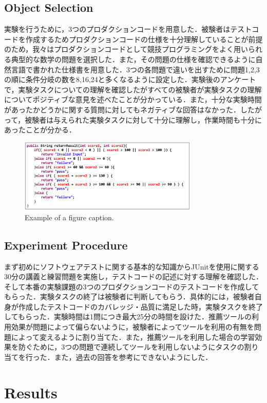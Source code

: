 \documentclass[conference]{IEEEtran}
\begin{document}
\subsection{Object Selection}
実験を行うために，3つのプロダクションコードを用意した．被験者はテストコードを作成するためプロダクションコードの仕様を十分理解していることが前提のため，我々はプロダクションコードとして競技プログラミングをよく用いられる典型的な数学の問題を選択した．また，その問題の仕様を確認できるように自然言語で書かれた仕様書を用意した．3つの各問題で違いを出すために問題1,2,3の順に条件分岐の数を8,16,24と多くなるように設定した．実験後のアンケートで，実験タスクについての理解を確認したがすべての被験者が実験タスクの理解についてポジティブな意見を述べたことが分かっている．また，十分な実験時間があったかどうかに関する質問に対してもネガティブな回答はなかった．したがって，被験者は与えられた実験タスクに対して十分に理解し，作業時間も十分にあったことが分かる．

\begin{figure}[htbp]
\centerline{\includegraphics[width=8.5cm]{src.pdf}}
\caption{Example of a figure caption.}
\label{fig}
\end{figure}

\subsection{Experiment Procedure}
まず初めにソフトウェアテストに関する基本的な知識からJUnitを使用に関する30分の講義と練習問題を実施し，テストコードの記述に対する理解を確認した．そして本番の実験課題の3つのプロダクションコードのテストコードを作成してもらった．実験タスクの終了は被験者に判断してもらう．具体的には，被験者自身が作成したテストコードのカバレッジ・品質に満足した時，実験タスクを終了してもらった．実験時間は1問につき最大25分の時間を設けた．推薦ツールの利用効果が問題によって偏らないように，被験者によってツールを利用の有無を問題によって変えるように割り当てた．また，推薦ツールを利用した場合の学習効果を防ぐために，3つの問題で連続してツールを利用しないようにタスクの割り当てを行った．また，過去の回答を参考にできないようにした．

\section{Results}
\end{document}
